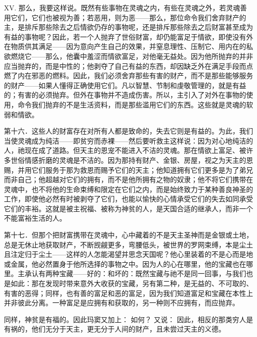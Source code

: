 XV. 那么，我要这样说。既然有些事物在灵魂之内，有些在灵魂之外，若灵魂善用它们，它们也被视为善；若恶用，则为恶——那么，那位命令我们舍弃财产的主，是排斥那些除去之后情欲仍存的事物呢，还是排斥那些除去之后财富甚至成为有益的事物呢？因此，若一个人抛弃了世俗财富，却仍能富足于情欲，即使没有外在物质供其满足——因为意向产生自己的效果，并窒息理性、压制它、用内在的私欲燃烧它——那么，他囊中羞涩而情欲富足，对他毫无益处。因为他所抛弃的并非应当抛弃的，而是中性的；他剥夺了自己有益的东西，却因缺乏外在满足手段而点燃了内在邪恶的燃料。因此，我们必须舍弃那些有害的财产，而不是那些能够服务的财产——如果人懂得正确使用它们。凡以智慧、节制和虔敬管理的，就是有益的；有害的必须抛弃。但外在事物并不造成伤害。所以，主引入了对外在事物的使用，命令我们抛弃的不是生活资料，而是那些滥用它们的东西。这些就是灵魂的软弱和情欲。\par

第十六．这些人的财富存在对所有人都是致命的，失去它则是有益的。为此，我们当使灵魂成为纯洁——即贫穷而赤裸——然后要听救主这样说：因为对心地纯洁的人，祂现在成了道路。但天主的恩宠不能进入不洁的灵魂。那在情欲上富足、被许多世俗情感折磨的灵魂是不洁的。因为那持有财产、金银、房屋，视之为天主的恩赐，并用它们服务于那为救恩而赐予它们的天主；他知道拥有它们更多是为了弟兄而非自己；他超越对它们的拥有，而不是他所拥有之物的奴隶；他不将它们携带在灵魂中，也不将他的生命束缚和限定在它们之内，而是始终致力于某种善良神圣的工作，即使他必然有时被剥夺了它们，也能以愉快的心情承受它们的失去如同承受它们的丰裕。这就是被主祝福、被称为神贫的人，是天国合适的继承人，而非一个不能富裕生活的人。\par

第十七．但那个把财富携带在灵魂中，心中藏着的不是天主圣神而是金银或土地，总是无休止地获取财产，不断觊觎更多，弯腰低头，被世界的罗网束缚，本是尘土且注定归于尘土——这样的人怎能渴望并思念天国呢？他心里装着的不是心而是地或金属，他必然置身于他所选择的事物之中。因为人的心在哪里，他的宝藏也在哪里。主承认有两种宝藏——好的：和坏的：既然宝藏与祂不是同一回事，与我们也是如此：那在发现时带来意外大收获的宝藏，另有第二种，是无益的、不可取的、有害的恶得；同样，也有善的富足和恶的富足，因为我们知道富足和宝藏在本性上并非彼此分离。一种富足是应拥有和获取的，另一种则不应拥有，而应抛弃。\par

同样，神贫是有福的。因此玛窦又加上： 如何？ 又说： 因此，相反的那类穷人是有祸的，他们无分于天主，更无分于人间的财产，且未尝过天主的义德。\par

